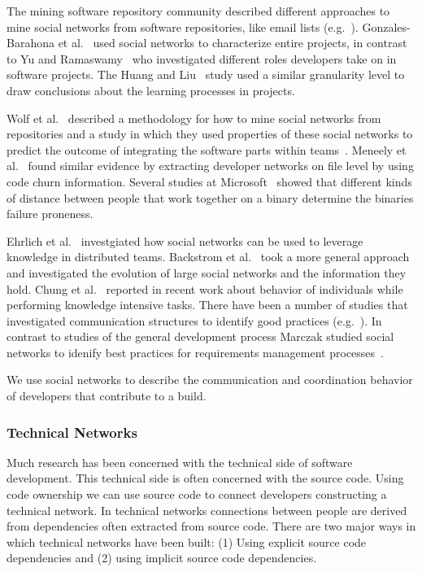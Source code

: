 \documentclass{sig-alternate}
\begin{document}
The mining software repository community described different approaches to mine
social networks from software repositories, like email lists
(e.g.~\cite{bird:msr:2006}). Gonzales-Barahona et al.~\cite{luis:msr:2004} used
social networks to characterize entire projects, in contrast to Yu and
Ramaswamy~\cite{yu:msr:2007} who investigated different roles developers take on
in software projects. The Huang and Liu~\cite{huang:msr:2005} study used a
similar granularity level to draw conclusions about the learning processes in projects.

Wolf et al.~\cite{wolf:ieee:2009} described a methodology for how to mine social
networks from repositories and a study in which they used properties of these
social networks to predict the outcome of integrating the software parts within
teams~\cite{wolf:icse:2009}. Meneely et al.~\cite{meneely:fse:2008} found similar
evidence by extracting developer networks on file level by using code churn
information. Several studies at Microsoft~\cite{bird:acm:2009,nagappan:icse:2008}
showed that different kinds of distance between people that work together on a
binary determine the binaries failure proneness.

Ehrlich et al.~\cite{ehrlich:icgse:2006} investgiated how social networks
can be used to leverage knowledge in distributed teams.
Backstrom et al.~\cite{backstrom:kdd:2006} took a more general approach and investigated the
evolution of large social networks and the information they hold. Chung et
al.~\cite{chung:cpr:07} reported in recent work about behavior of individuals
while performing knowledge intensive tasks. There have been a number of studies
that investigated communication structures to identify good practices
(e.g.~\cite{hinds:cscw:2006,hossain:cscw:2006,bird:fse:2008,xu:hicss:2005,hinds:hicss:2008}).
In contrast to studies of the general development process Marczak studied
social networks to idenify best practices for requirements management
processes~\cite{marczak:re:2008}.

We use social networks to describe the communication and coordination
behavior of developers that contribute to a build.

\subsubsection{Technical Networks}
Much research has been concerned with the technical side of software development.
This technical side is often concerned with the source code. Using code ownership
we can use source code to connect developers constructing a technical network. In
technical networks connections between people are derived from dependencies often
extracted from source code. There are two major ways in which technical networks
have been built: (1) Using explicit source code dependencies and (2) using
implicit source code dependencies.
\end{document}

